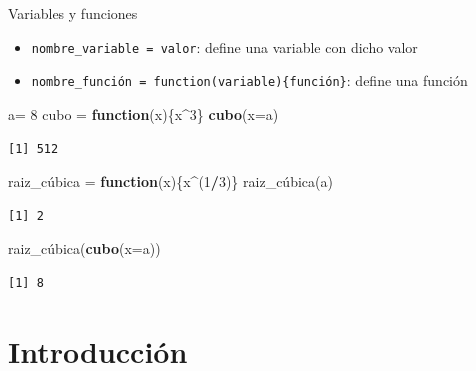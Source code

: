 \documentclass[
  ignorenonframetext,
]{beamer}
\newenvironment{Shaded}{\begin{snugshade}}{\end{snugshade}}
\newcommand{\AttributeTok}[1]{\textcolor[rgb]{0.13,0.29,0.53}{#1}}
\newcommand{\ControlFlowTok}[1]{\textcolor[rgb]{0.13,0.29,0.53}{\textbf{#1}}}
\newcommand{\DecValTok}[1]{\textcolor[rgb]{0.00,0.00,0.81}{#1}}
\newcommand{\FunctionTok}[1]{\textcolor[rgb]{0.13,0.29,0.53}{\textbf{#1}}}
\newcommand{\NormalTok}[1]{#1}
\newcommand{\OtherTok}[1]{\textcolor[rgb]{0.56,0.35,0.01}{#1}}
\newcommand{\SpecialCharTok}[1]{\textcolor[rgb]{0.81,0.36,0.00}{\textbf{#1}}}
\providecommand{\tightlist}{%
  \setlength{\itemsep}{0pt}\setlength{\parskip}{0pt}}
\begin{document}
\begin{frame}[fragile]{Variables y funciones}
\label{variables-y-funciones}
\begin{itemize}
\tightlist
\item
  \texttt{nombre\_variable\ =\ valor}: define una variable con dicho
  valor
\item
  \texttt{nombre\_función\ =\ function(variable)\{función\}}: define una
  función
\end{itemize}

\begin{Shaded}
\begin{Highlighting}[]
\NormalTok{a}\OtherTok{=} \DecValTok{8}
\NormalTok{cubo }\OtherTok{=} \ControlFlowTok{function}\NormalTok{(x)\{x}\SpecialCharTok{\^{}}\DecValTok{3}\NormalTok{\}}
\FunctionTok{cubo}\NormalTok{(}\AttributeTok{x=}\NormalTok{a)}
\end{Highlighting}
\end{Shaded}

\begin{verbatim}
[1] 512
\end{verbatim}

\begin{Shaded}
\begin{Highlighting}[]
\NormalTok{raiz\_cúbica }\OtherTok{=} \ControlFlowTok{function}\NormalTok{(x)\{x}\SpecialCharTok{\^{}}\NormalTok{(}\DecValTok{1}\SpecialCharTok{/}\DecValTok{3}\NormalTok{)\}}
\NormalTok{raiz\_cúbica(a)}
\end{Highlighting}
\end{Shaded}

\begin{verbatim}
[1] 2
\end{verbatim}

\begin{Shaded}
\begin{Highlighting}[]
\NormalTok{raiz\_cúbica(}\FunctionTok{cubo}\NormalTok{(}\AttributeTok{x=}\NormalTok{a))}
\end{Highlighting}
\end{Shaded}

\begin{verbatim}
[1] 8
\end{verbatim}
\end{frame}

\section{Introducción}\label{introducciuxf3n}
\end{document}
